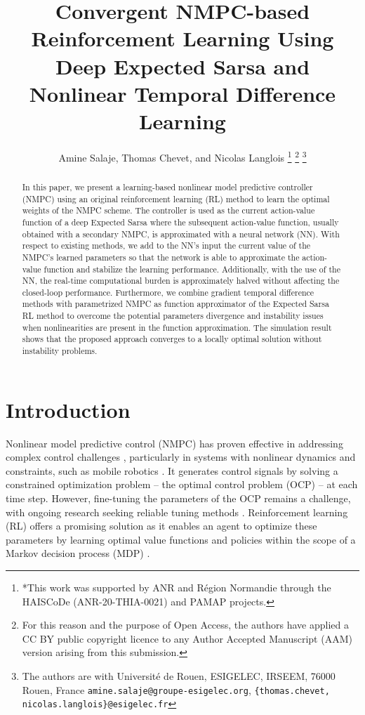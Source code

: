 \documentclass[letterpaper, 10pt, conference]{ieeeconf}
\title{\LARGE \bf
	Convergent NMPC-based Reinforcement Learning Using Deep Expected Sarsa and Nonlinear Temporal Difference Learning
}
\author{Amine Salaje, Thomas Chevet, and Nicolas Langlois%
\thanks{*This work was supported by ANR and R{\'e}gion Normandie through the HAISCoDe (ANR-20-THIA-0021) and PAMAP projects.}%
\thanks{For this reason and the purpose of Open Access, the authors have applied a CC BY public copyright licence to any Author Accepted Manuscript (AAM) version arising from this submission.}%
\thanks{The authors are with Universit\'e de Rouen, ESIGELEC, IRSEEM, 76000 Rouen, France
	{\tt\small amine.salaje@groupe-esigelec.org}, {\tt\small \{thomas.chevet, nicolas.langlois\}@esigelec.fr}}%
}
\begin{document}
\maketitle
\thispagestyle{empty}
\pagestyle{empty}

\begin{abstract}
	In this paper, we present a learning-based nonlinear model predictive controller (NMPC) using an original reinforcement learning (RL) method to learn the optimal weights of the NMPC scheme.
	The controller is used as the current action-value function of a deep Expected Sarsa where the subsequent action-value function, usually obtained with a secondary NMPC, is approximated with a neural network (NN).
	With respect to existing methods, we add to the NN's input the current value of the NMPC's learned parameters so that the network is able to approximate the action-value function and stabilize the learning performance.
	Additionally, with the use of the NN, the real-time computational burden is approximately halved without affecting the closed-loop performance. 
	Furthermore, we combine gradient temporal difference methods with parametrized NMPC as function approximator of the Expected Sarsa RL method to overcome the potential parameters divergence and instability issues when nonlinearities are present in the function approximation.
	The simulation result shows that the proposed approach converges to a locally optimal solution without instability problems.
\end{abstract}

\section{Introduction}

Nonlinear model predictive control (NMPC) has proven effective in addressing complex control challenges \cite{grune2017nonlinear}, particularly in systems with nonlinear dynamics and constraints, such as mobile robotics \cite{nascimento2018nonholonomic}.
It generates control signals by solving a constrained optimization problem -- the optimal control problem (OCP) -- at each time step. 
However, fine-tuning the parameters of the OCP remains a challenge, with ongoing research seeking reliable tuning methods \cite{zhang2022advances}.
Reinforcement learning (RL) offers a promising solution as it enables an agent to optimize these parameters by learning optimal value functions and policies within the scope of a Markov decision process (MDP) \cite{sutton2018reinforcement}.
\end{document}
